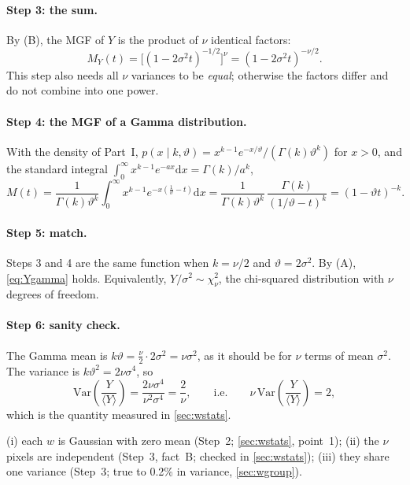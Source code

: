 \documentclass[11pt,a4paper]{article}
\newcommand{\dd}{\mathrm{d}}
\begin{document}
\paragraph{Step 3: the sum.} By (B), the MGF of $Y$ is the product of $\nu$ identical
factors:
\[
  M_Y(t) = \big[(1-2\sigma^2t)^{-1/2}\big]^{\nu} = (1-2\sigma^2t)^{-\nu/2}.
\]
This step also needs all $\nu$ variances to be \emph{equal}; otherwise the factors
differ and do not combine into one power.

\paragraph{Step 4: the MGF of a Gamma distribution.} With the density of
Part~I, $p(x\mid k,\vartheta)=x^{k-1}e^{-x/\vartheta}/(\Gamma(k)\vartheta^k)$ for $x>0$,
and the standard integral $\int_0^\infty x^{k-1}e^{-ax}\dd x=\Gamma(k)/a^k$,
\[
  M(t) = \frac{1}{\Gamma(k)\vartheta^k}\int_0^\infty x^{k-1}e^{-x\left(\frac1\vartheta-t\right)}\dd x
  = \frac{1}{\Gamma(k)\vartheta^k}\,\frac{\Gamma(k)}{(1/\vartheta-t)^{k}}
  = (1-\vartheta t)^{-k}.
\]

\paragraph{Step 5: match.} Steps 3 and 4 are the same function when $k=\nu/2$ and
$\vartheta=2\sigma^2$. By (A), \cref{eq:Ygamma} holds. Equivalently,
$Y/\sigma^2\sim\chi^2_\nu$, the chi-squared distribution with $\nu$ degrees of freedom.

\paragraph{Step 6: sanity check.} The Gamma mean is
$k\vartheta=\tfrac{\nu}{2}\cdot2\sigma^2=\nu\sigma^2$, as it should be for $\nu$ terms of
mean $\sigma^2$. The variance is $k\vartheta^2=2\nu\sigma^4$, so
\[
  \mathrm{Var}\!\left(\frac{Y}{\langle Y\rangle}\right)=\frac{2\nu\sigma^4}{\nu^2\sigma^4}=\frac2\nu,
  \qquad\text{i.e.}\qquad \nu\,\mathrm{Var}\!\left(\frac{Y}{\langle Y\rangle}\right)=2,
\]
which is the quantity measured in \cref{sec:wstats}.

\begin{keybox}
(i) each $w$ is Gaussian with zero mean (Step~2; \cref{sec:wstats}, point~1);
(ii) the $\nu$ pixels are independent (Step~3, fact~B; checked in \cref{sec:wstats});
(iii) they share one variance (Step~3; true to 0.2\% in variance, \cref{sec:wgroup}).
\end{keybox}
\end{document}
